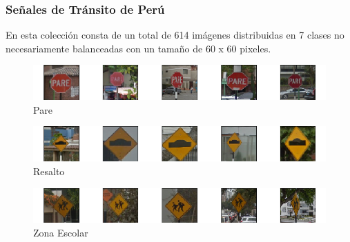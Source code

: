		\subsubsection{Señales de Tránsito de Perú}

			En esta colección consta de un total de 614 imágenes distribuidas en 7 clases no necesariamente balanceadas con un tamaño de 60 x 60 pixeles.

			\begin{figure}[H]
				\begin{center}
				\includegraphics[width=1\textwidth]{images/desarrollo/imagenes/peru/1__(1).png}
				\end{center}
				\begin{center}
				\caption{\small{Pare}}
				\end{center}
				\vspace{-1.5em}
			\end{figure}

			\begin{figure}[H]
				\begin{center}
				\includegraphics[width=1\textwidth]{images/desarrollo/imagenes/peru/1__(2).png}
				\end{center}
				\begin{center}
				\caption{\small{Resalto}}
				\end{center}
				\vspace{-1.5em}
			\end{figure}

			\begin{figure}[H]
				\begin{center}
				\includegraphics[width=1\textwidth]{images/desarrollo/imagenes/peru/1__(3).png}
				\end{center}
				\begin{center}
				\caption{\small{Zona Escolar}}
				\end{center}
				\vspace{-1.5em}
			\end{figure}

